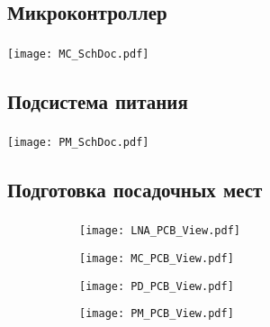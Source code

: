 \documentclass[c]{beamer}  %
\begin{document}
\subsection{Микроконтроллер}
	
	\begin{frame}
		\frametitle{\insertsection}
		\framesubtitle{\insertsubsection}
		\centering
		\texttt{[image: MC\_SchDoc.pdf]}	
	\end{frame}
	
\subsection{Подсистема питания}
	
	\begin{frame}
		\frametitle{\insertsection}
		\framesubtitle{\insertsubsection}
		\centering
		\texttt{[image: PM\_SchDoc.pdf]}	
	\end{frame}

\subsection{Подготовка посадочных мест}

	\begin{frame}
		\frametitle{\insertsection}
		\framesubtitle{\insertsubsection}
		\centering
		\begin{figure}
			\begin{subfigure}[t]{0.45\textwidth}
				\texttt{[image: LNA\_PCB\_View.pdf]}
			\end{subfigure}%
			\begin{subfigure}[t]{0.45\textwidth}
				\texttt{[image: MC\_PCB\_View.pdf]}
			\end{subfigure}
			
			\begin{subfigure}[b]{0.45\textwidth}
				\texttt{[image: PD\_PCB\_View.pdf]}
			\end{subfigure}%
			\begin{subfigure}[b]{0.45\textwidth}
				\texttt{[image: PM\_PCB\_View.pdf]}
			\end{subfigure}
		\end{figure}
		
	\end{frame}
\end{document}
